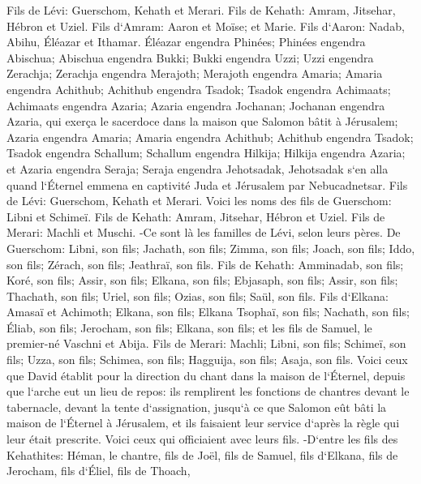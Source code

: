 \verse Fils de Lévi: Guerschom, Kehath et Merari. 
\verse Fils de Kehath: Amram, Jitsehar, Hébron et Uziel. 
\verse Fils d`Amram: Aaron et Moïse; et Marie. Fils d`Aaron: Nadab, Abihu, Éléazar et Ithamar. 
\verse Éléazar engendra Phinées; Phinées engendra Abischua; 
\verse Abischua engendra Bukki; Bukki engendra Uzzi; 
\verse Uzzi engendra Zerachja; Zerachja engendra Merajoth; 
\verse Merajoth engendra Amaria; Amaria engendra Achithub; 
\verse Achithub engendra Tsadok; Tsadok engendra Achimaats; 
\verse Achimaats engendra Azaria; Azaria engendra Jochanan; 
\verse Jochanan engendra Azaria, qui exerça le sacerdoce dans la maison que Salomon bâtit à Jérusalem; 
\verse Azaria engendra Amaria; Amaria engendra Achithub; 
\verse Achithub engendra Tsadok; Tsadok engendra Schallum; 
\verse Schallum engendra Hilkija; Hilkija engendra Azaria; 
\verse et Azaria engendra Seraja; Seraja engendra Jehotsadak, 
\verse Jehotsadak s`en alla quand l`Éternel emmena en captivité Juda et Jérusalem par Nebucadnetsar. 
\verse Fils de Lévi: Guerschom, Kehath et Merari. 
\verse Voici les noms des fils de Guerschom: Libni et Schimeï. 
\verse Fils de Kehath: Amram, Jitsehar, Hébron et Uziel. 
\verse Fils de Merari: Machli et Muschi. -Ce sont là les familles de Lévi, selon leurs pères. 
\verse De Guerschom: Libni, son fils; Jachath, son fils; Zimma, son fils; 
\verse Joach, son fils; Iddo, son fils; Zérach, son fils; Jeathraï, son fils. 
\verse Fils de Kehath: Amminadab, son fils; Koré, son fils; Assir, son fils; 
\verse Elkana, son fils; Ebjasaph, son fils; Assir, son fils; 
\verse Thachath, son fils; Uriel, son fils; Ozias, son fils; Saül, son fils. 
\verse Fils d`Elkana: Amasaï et Achimoth; 
\verse Elkana, son fils; Elkana Tsophaï, son fils; Nachath, son fils; 
\verse Éliab, son fils; Jerocham, son fils; Elkana, son fils; 
\verse et les fils de Samuel, le premier-né Vaschni et Abija. 
\verse Fils de Merari: Machli; Libni, son fils; Schimeï, son fils; Uzza, son fils; 
\verse Schimea, son fils; Hagguija, son fils; Asaja, son fils. 
\verse Voici ceux que David établit pour la direction du chant dans la maison de l`Éternel, depuis que l`arche eut un lieu de repos: 
\verse ils remplirent les fonctions de chantres devant le tabernacle, devant la tente d`assignation, jusqu`à ce que Salomon eût bâti la maison de l`Éternel à Jérusalem, et ils faisaient leur service d`après la règle qui leur était prescrite. 
\verse Voici ceux qui officiaient avec leurs fils. -D`entre les fils des Kehathites: Héman, le chantre, fils de Joël, fils de Samuel, 
\verse fils d`Elkana, fils de Jerocham, fils d`Éliel, fils de Thoach, 

